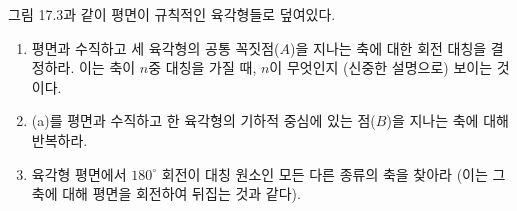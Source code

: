 	\begin{question}
		그림 17.3과 같이 평면이 규칙적인 육각형들로 덮여있다.
		\begin{enumerate}[label=(\alph*), leftmargin=*, parsep=0em, topsep=0pt]
			\item 평면과 수직하고 세 육각형의 공통 꼭짓점($A$)을 지나는 축에 대한 회전 대칭을 결정하라. 이는 축이 $n$중 대칭을 가질 때, $n$이 무엇인지 (신중한 설명으로) 보이는 것이다.
			\item (a)를 평면과 수직하고 한 육각형의 기하적 중심에 있는 점($B$)을 지나는 축에 대해 반복하라.
			\item 육각형 평면에서 $180^{\circ}$ 회전이 대칭 원소인 모든 다른 종류의 축을 찾아라 (이는 그 축에 대해 평면을 회전하여 뒤집는 것과 같다).
		\end{enumerate}
	\end{question}
